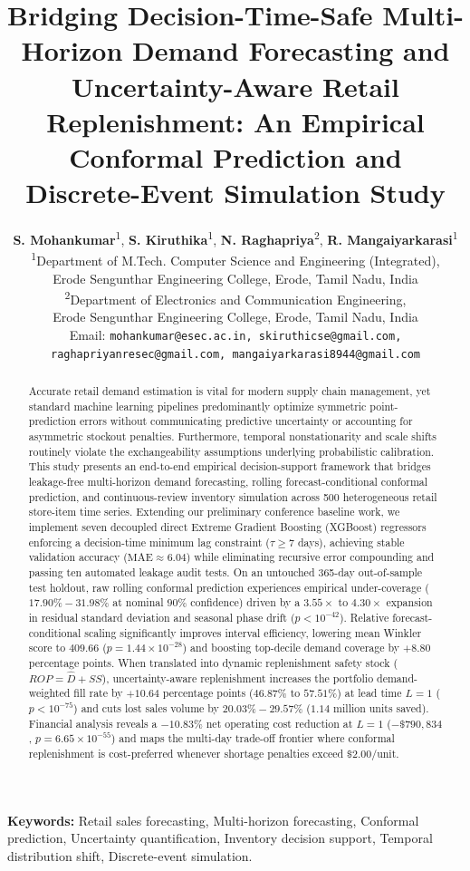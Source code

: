 \documentclass[11pt,a4paper]{article}
\title{\textbf{Bridging Decision-Time-Safe Multi-Horizon Demand Forecasting and Uncertainty-Aware Retail Replenishment: An Empirical Conformal Prediction and Discrete-Event Simulation Study}}
\author{
  \textbf{S. Mohankumar}\textsuperscript{1}, 
  \textbf{S. Kiruthika}\textsuperscript{1}, 
  \textbf{N. Raghapriya}\textsuperscript{2}, 
  \textbf{R. Mangaiyarkarasi}\textsuperscript{1} \\[0.5em]
  \small\textsuperscript{1}Department of M.Tech. Computer Science and Engineering (Integrated), \\
  \small Erode Sengunthar Engineering College, Erode, Tamil Nadu, India \\
  \small\textsuperscript{2}Department of Electronics and Communication Engineering, \\
  \small Erode Sengunthar Engineering College, Erode, Tamil Nadu, India \\
  \small Email: \texttt{mohankumar@esec.ac.in, skiruthicse@gmail.com, raghapriyanresec@gmail.com, mangaiyarkarasi8944@gmail.com}
}
\date{}
\begin{document}
\maketitle

\begin{abstract}
Accurate retail demand estimation is vital for modern supply chain management, yet standard machine learning pipelines predominantly optimize symmetric point-prediction errors without communicating predictive uncertainty or accounting for asymmetric stockout penalties. Furthermore, temporal nonstationarity and scale shifts routinely violate the exchangeability assumptions underlying probabilistic calibration. This study presents an end-to-end empirical decision-support framework that bridges leakage-free multi-horizon demand forecasting, rolling forecast-conditional conformal prediction, and continuous-review inventory simulation across 500 heterogeneous retail store-item time series. Extending our preliminary conference baseline work, we implement seven decoupled direct Extreme Gradient Boosting (XGBoost) regressors enforcing a decision-time minimum lag constraint ($\tau \ge 7$ days), achieving stable validation accuracy ($\text{MAE} \approx 6.04$) while eliminating recursive error compounding and passing ten automated leakage audit tests. On an untouched 365-day out-of-sample test holdout, raw rolling conformal prediction experiences empirical under-coverage ($17.90\%-31.98\%$ at nominal $90\%$ confidence) driven by a $3.55\times$ to $4.30\times$ expansion in residual standard deviation and seasonal phase drift ($p < 10^{-42}$). Relative forecast-conditional scaling significantly improves interval efficiency, lowering mean Winkler score to $409.66$ ($p = 1.44 \times 10^{-28}$) and boosting top-decile demand coverage by $+8.80$ percentage points. When translated into dynamic replenishment safety stock ($ROP = \hat{D} + SS$), uncertainty-aware replenishment increases the portfolio demand-weighted fill rate by $+10.64$ percentage points ($46.87\%$ to $57.51\%$) at lead time $L=1$ ($p < 10^{-75}$) and cuts lost sales volume by $20.03\%-29.57\%$ ($1.14$ million units saved). Financial analysis reveals a $-10.83\%$ net operating cost reduction at $L=1$ ($-\$790,834$, $p = 6.65 \times 10^{-55}$) and maps the multi-day trade-off frontier where conformal replenishment is cost-preferred whenever shortage penalties exceed $\$2.00/\text{unit}$.
\end{abstract}

\textbf{Keywords:} Retail sales forecasting, Multi-horizon forecasting, Conformal prediction, Uncertainty quantification, Inventory decision support, Temporal distribution shift, Discrete-event simulation.
\end{document}
